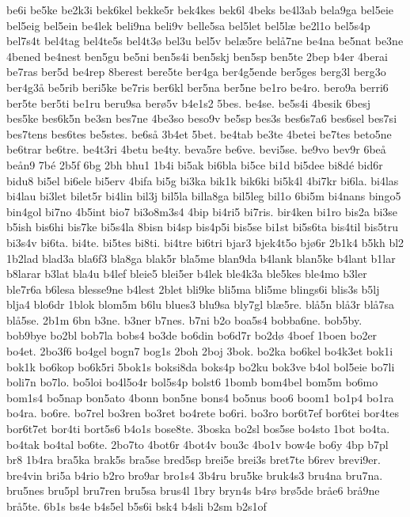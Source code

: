 {be6i
be5ke
be2k3i
bek6kel
bekke5r
bek4kes
bek6l
4beks
be4l3ab
bela9ga
bel5eie
bel5eig
bel5ein
be4lek
beli9na
beli9v
belle5sa
bel5let
bel5l^^e6
be2l1o
bel5s4p
bel7s4t
bel4tag
bel4te5s
bel4t3^^f8
bel3u
bel5v
bel^^e65re
bel^^e57ne
be4na
be5nat
be3ne
4bened
be4nest
ben5gu
be5ni
ben5s4i
ben5skj
ben5sp
ben5te
2bep
b4er
4berai
be7ras
ber5d
be4rep
8berest
bere5te
ber4ga
ber4g5ende
ber5ges
berg3l
berg3o
ber4g3^^e5
be5rib
beri5ke
be7ris
ber6kl
ber5na
ber5ne
be1ro
be4ro.
bero9a
berri6
ber5te
ber5ti
be1ru
beru9sa
ber^^f85v
b4e1s2
5bes.
be4se.
be5s4i
4besik
6besj
bes5ke
bes6k5n
be3sn
bes7ne
4be3so
beso9v
be5sp
bes3s
bes6s7a6
bes6sel
bes7si
bes7tens
bes6tes
be5stes.
be6s^^e5
3b4et
5bet.
be4tab
be3te
4betei
be7tes
beto5ne
be6trar
be6tre.
be4t3ri
4betu
be4ty.
beva5re
be6ve.
bevi5se.
be9vo
bev9r
6be^^e5
be^^e5n9
7b^^e9
2b5f
6bg
2bh
bhu1
1b4i
bi5ak
bi6bla
bi5ce
bi1d
bi5dee
bi8d^^e9
bid6r
bidu8
bi5el
bi6ele
bi5erv
4bifa
bi5g
bi3ka
bik1k
bik6ki
bi5k4l
4bi7kr
bi6la.
bi4las
bi4lau
bi3let
bilet5r
bi4lin
bil3j
bil5la
billa8ga
bil5leg
bil1o
6bi5m
bi4nans
bingo5
bin4gol
bi7no
4b5int
bio7
bi3o8m3s4
4bip
bi4ri5
bi7ris.
bir4ken
bi1ro
bis2a
bi3se
b5ish
bis6hi
bis7ke
bi5s4la
8bisn
bi4sp
bis4p5i
bis5se
bi1st
bi5s6ta
bis4til
bis5tru
bi3s4v
bi6ta.
bi4te.
bi5tes
bi8ti.
bi4tre
bi6tri
bjar3
bjek4t5o
bj^^f86r
2b1k4
b5kh
bl2
1b2lad
blad3a
bla6f3
bla8ga
blak5r
bla5me
blan9da
b4lank
blan5ke
b4lant
b1lar
b8larar
b3lat
bla4u
b4lef
bleie5
blei5er
b4lek
ble4k3a
ble5kes
ble4mo
b3ler
ble7r6a
b6lesa
blesse9ne
b4lest
2blet
bli9ke
bli5ma
bli5me
blings6i
blis3s
b5lj
blja4
blo6dr
1blok
blom5m
b6lu
blues3
blu9sa
bly7gl
bl^^e65re.
bl^^e55n
bl^^e53r
bl^^e57sa
bl^^e55se.
2b1m
6bn
b3ne.
b3ner
b7nes.
b7ni
b2o
boa5s4
bobba6ne.
bob5by.
bob9bye
bo2bl
bob7la
bobs4
bo3de
bo6din
bo6d7r
bo2d^^f8
4boef
1boen
bo2er
bo4et.
2bo3f6
bo4gel
bogn7
bog1s
2boh
2boj
3bok.
bo2ka
bo6kel
bo4k3et
bok1i
bok1k
bo6kop
bo6k5ri
5bok1s
boksi8da
boks4p
bo2ku
bok3ve
b4ol
bol5eie
bo7li
boli7n
bo7lo.
bo5loi
bo4l5o4r
bol5s4p
bolst6
1bomb
bom4bel
bom5m
bo6mo
bom1s4
bo5nap
bon5ato
4bonn
bon5ne
bons4
bo5nus
boo6
boom1
bo1p4
bo1ra
bo4ra.
bo6re.
bo7rel
bo3ren
bo3ret
bo4rete
bo6ri.
bo3ro
bor6t7ef
bor6tei
bor4tes
bor6t7et
bor4ti
bort5s6
b4o1s
bose8te.
3boska
bo2sl
bos5se
bo4sto
1bot
bo4ta.
bo4tak
bo4tal
bo6te.
2bo7to
4bot6r
4bot4v
bou3c
4bo1v
bow4e
bo6y
4bp
b7pl
br8
1b4ra
bra5ka
brak5s
bra5se
bred5sp
brei5e
brei3s
bret7te
b6rev
brevi9er.
bre4vin
bri5a
b4rio
b2ro
bro9ar
bro1s4
3b4ru
bru5ke
bruk4s3
bru4na
bru7na.
bru5nes
bru5pl
bru7ren
bru5sa
brus4l
1bry
bryn4s
b4r^^f8
br^^f85de
br^^e5e6
br^^e59ne
br^^e55te.
6b1s
bs4e
b4s5el
b5s6i
bsk4
b4sli
b2sm
b2s1of
}
